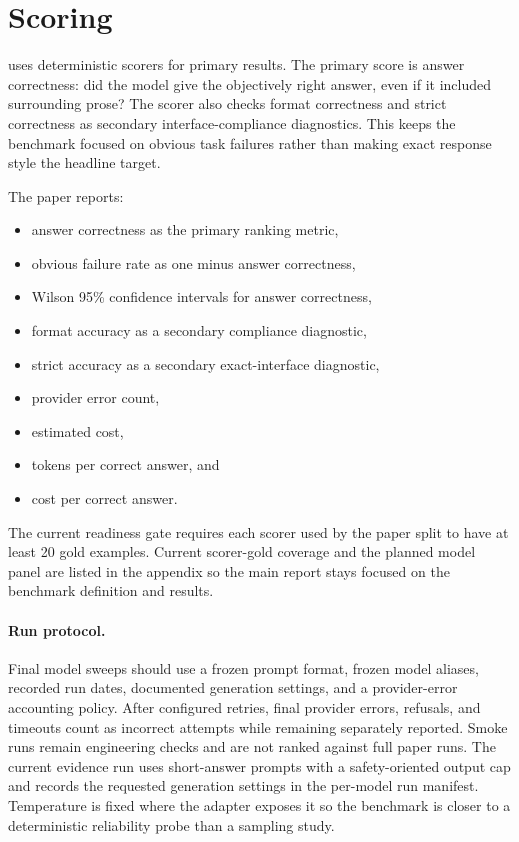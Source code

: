\section{Scoring}

\benchmarkname{} uses deterministic scorers for primary results. The primary
score is answer correctness: did the model give the objectively right answer,
even if it included surrounding prose? The scorer also checks format
correctness and strict correctness as secondary interface-compliance
diagnostics. This keeps the benchmark focused on obvious task failures rather
than making exact response style the headline target.

The paper reports:

\begin{itemize}
  \item answer correctness as the primary ranking metric,
  \item obvious failure rate as one minus answer correctness,
  \item Wilson 95\% confidence intervals for answer correctness,
  \item format accuracy as a secondary compliance diagnostic,
  \item strict accuracy as a secondary exact-interface diagnostic,
  \item provider error count,
  \item estimated cost,
  \item tokens per correct answer, and
  \item cost per correct answer.
\end{itemize}

The current readiness gate requires each scorer used by the paper split to
have at least 20 gold examples. Current scorer-gold coverage and the planned
model panel are listed in the appendix so the main report stays focused on the
benchmark definition and results.

\paragraph{Run protocol.}
Final model sweeps should use a frozen prompt format, frozen model aliases,
recorded run dates, documented generation settings, and a provider-error
accounting policy. After configured retries, final provider errors, refusals,
and timeouts count as incorrect attempts while remaining separately reported.
Smoke runs remain engineering checks and are not ranked against full paper runs.
The current evidence run uses short-answer prompts with a safety-oriented output
cap and records the requested generation settings in the per-model run
manifest. Temperature is fixed where the adapter exposes it so the benchmark is
closer to a deterministic reliability probe than a sampling study.

